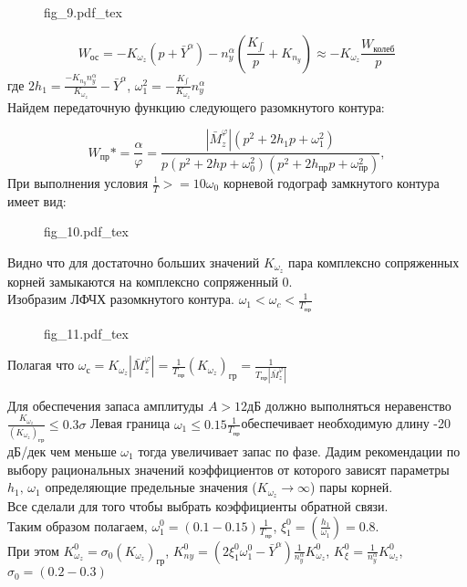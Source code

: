 \documentclass{article}
\begin{document}
\begin{figure}[H]
	\begin{minipage}{\textwidth}
		\centering
		{fig_9.pdf_tex}
	\end{minipage}
\end{figure}


\[
	W_\text{ос} = -K_{\omega_z} (p+\bar{Y}^\alpha) - n_y^\alpha (\frac{K_{\int}}{p} + K_{n_y})
	\approx -K_{\omega_z}\frac{W_\text{колеб}}{p}
\]
где $2h_1 = \frac{-K_{n_y} n_y^\alpha}{K_{\omega_z}} - \bar{Y}^\alpha$, $\omega_1^2 = -\frac{K_{\int}} {K_{\omega_z}} n_y^\alpha $\\
Найдем передаточную функцию следующего разомкнутого контура:

\[
	W_\text{пр}* = {\frac{\alpha}{\varphi}} = \frac{|\bar{M}_z^\varphi| (p^2 + 2h_1 p + \omega_1^2)} {p(p^2 + 2 hp + \omega_0^2) (p^2 + 2h_\text{пр}p + \omega_\text{пр}^2)},
\]
При выполнения условия $\frac{1}{T} >= 10 \omega_0$ корневой годограф замкнутого контура имеет вид:
\begin{figure}[H]
	\centering
	{fig_10.pdf_tex}
\end{figure}
Видно что для достаточно больших значений $K_{\omega_z}$ пара комплексно сопряженных корней замыкаются на комплексно сопряженный 0.\\
Изобразим ЛФЧХ разомкнутого контура.
$\omega_1 < \omega_c < \frac{1}{T_\text{пр}}$

\begin{figure}[H]
	\centering
	{fig_11.pdf_tex}
\end{figure}


Полагая что $\omega_\text{с} = K_{\omega_z} | \bar{M}_z^\varphi| = \frac{1}{T_\text{пр}}
	(K_{\omega_z})_\text{гр} = \frac{1}{T_\text{пр}|\bar{M}_z^\varphi|}$

Для обеспечения запаса амплитуды $A > 12 \text{дБ}$ должно выполняться неравенство $\frac{K_{\omega_z}}{(K_{\omega_z})_\text{гр}} \leq 0.3 \sigma $
Левая граница $\omega_1 \leq 0.15 \frac{1}{T_\text{пр}}$обеспечивает необходимую длину -20 дБ/дек чем меньше $\omega_1$ тогда увеличивает запас по фазе.
Дадим рекомендации по выбору рациональных значений коэффициентов от которого зависят параметры $h_1, \, \omega_1$ определяющие предельные значения ($K_{\omega_z} \rightarrow\infty$) пары корней.\\
Все сделали для того чтобы выбрать коэффициенты обратной связи. \\ 
Таким образом полагаем, $\omega_1^0 = (0.1 - 0.15) \frac{1}{T_\text{пр}}$, $\xi_1^0 = (\frac{h_1}{\omega_1}) = 0.8$.\\
При этом $K_{\omega_z}^0 = \sigma_0 (K_{\omega_z})_\text{гр}$, $K_{ny}^0 = (2\xi_1^0 \omega_1^0 - \bar{Y}^\alpha) \frac{1}{n_y^\alpha} K_{\omega_z}^0$, $K_{\xi}^0 = \frac{1}{n_y^\alpha} K_{\omega_z}^0$, $\sigma_0 = (0.2 - 0.3)$
\newpage
\end{document}

